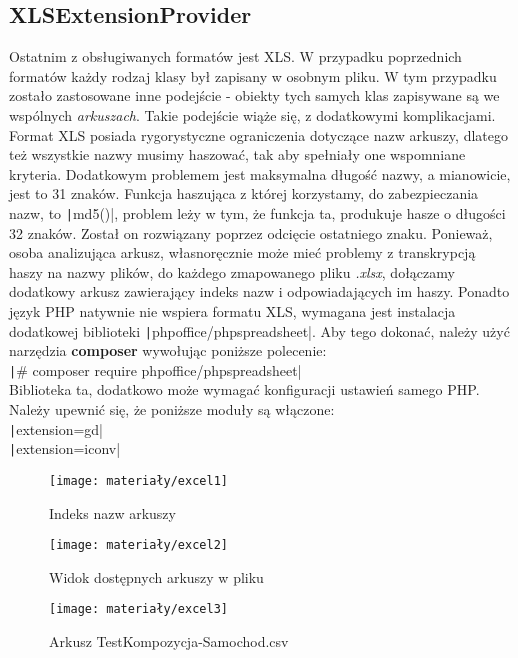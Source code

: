 \subsection{XLSExtensionProvider}
Ostatnim z obsługiwanych formatów jest XLS. W przypadku poprzednich formatów każdy rodzaj klasy był zapisany w osobnym pliku. W tym przypadku zostało zastosowane inne podejście - obiekty tych samych klas zapisywane są we wspólnych \textit{arkuszach}. Takie podejście wiąże się, z dodatkowymi komplikacjami. Format XLS posiada rygorystyczne ograniczenia dotyczące nazw arkuszy, dlatego też wszystkie nazwy musimy haszować, tak aby spełniały one wspomniane kryteria. Dodatkowym problemem jest maksymalna długość nazwy, a mianowicie, jest to 31 znaków. Funkcja haszująca z której korzystamy, do zabezpieczania nazw, to \texttt|md5()|, problem leży w tym, że funkcja ta, produkuje hasze o długości 32 znaków. Został on rozwiązany poprzez odcięcie ostatniego znaku. Ponieważ, osoba analizująca arkusz, własnoręcznie może mieć problemy z transkrypcją haszy na nazwy plików, do każdego zmapowanego pliku \textit{.xlsx}, dołączamy dodatkowy arkusz zawierający indeks nazw i odpowiadających im haszy. Ponadto język PHP natywnie nie wspiera formatu XLS, wymagana jest instalacja dodatkowej biblioteki \texttt|phpoffice/phpspreadsheet|. Aby tego dokonać, należy użyć narzędzia \textbf{composer} wywołując poniższe polecenie:\\
\texttt|# composer require phpoffice/phpspreadsheet|\\
Biblioteka ta, dodatkowo może wymagać konfiguracji ustawień samego PHP. Należy upewnić się, że poniższe moduły są włączone:\\
\texttt|extension=gd|\\
\texttt|extension=iconv|\\

\begin{figure}[ht]
	\centering
	\texttt{[image: materiały/excel1]}
	\caption{Indeks nazw arkuszy}
\end{figure}

\begin{figure}[ht]
	\centering
	\texttt{[image: materiały/excel2]}
	\caption{Widok dostępnych arkuszy w pliku}
\end{figure}

\begin{figure}[ht]
	\centering
	\texttt{[image: materiały/excel3]}
	\caption{Arkusz TestKompozycja-Samochod.csv}
\end{figure}